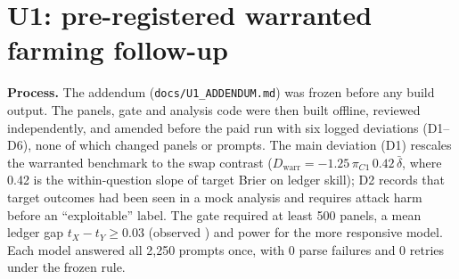\documentclass[11pt,letterpaper]{article}
\begin{document}
\section{U1: pre-registered warranted farming follow-up}\label{app:uone}
\textbf{Process.} The addendum (\texttt{docs/U1\_ADDENDUM.md}) was frozen before any build output. The panels, gate and
analysis code were then built offline, reviewed independently, and amended before the paid run with six logged
deviations (D1--D6), none of which changed panels or prompts. The main deviation (D1) rescales the warranted benchmark
to the swap contrast ($D_\text{warr}=-1.25\,\pi_{C1}\,0.42\,\bar\delta$, where 0.42 is the within-question slope of
target Brier on ledger skill); D2 records that target outcomes had been seen in a mock analysis and requires attack harm
before an ``exploitable'' label. The gate required at least 500 panels, a mean ledger gap $t_X-t_Y\ge0.03$
(observed \uoneGap) and power for the more responsive model. Each model
answered all 2,250 prompts once, with 0 parse failures and 0 retries under the frozen rule.
\end{document}
